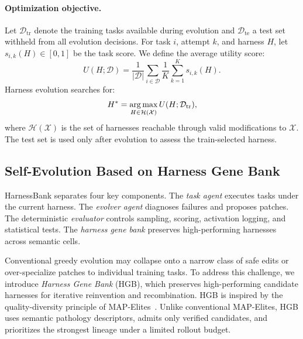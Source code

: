 \paragraph{Optimization objective.}
Let $\mathcal{D}_{\mathrm{tr}}$ denote the training tasks available during evolution and $\mathcal{D}_{\mathrm{te}}$ a test set withheld from all evolution decisions.
%
For task $i$, attempt $k$, and harness $H$, let $s_{i,k}(H)\in[0,1]$ be the task score.
%
We define the average utility score:
\begin{equation}
U(H;\mathcal{D})
=
\frac{1}{|\mathcal{D}|}
\sum_{i\in\mathcal{D}}
\frac{1}{K}
\sum_{k=1}^{K}s_{i,k}(H).
\end{equation}
%
Harness evolution searches for:
\begin{equation}
H^{*}
=
\operatorname*{arg\,max}_{H\in\mathcal{H}(\mathcal{X})}
U(H;\mathcal{D}_{\mathrm{tr}}),
\end{equation}
where $\mathcal{H}(\mathcal{X})$ is the set of harnesses reachable through valid modifications to $\mathcal{X}$.
%
The test set is used only after evolution to assess the train-selected harness.


\subsection{Self-Evolution Based on Harness Gene Bank}
\label{sec:se}
HarnessBank separates four key components.
%
The \emph{task agent} executes tasks under the current harness. The \emph{evolver agent} diagnoses failures and proposes patches. The deterministic \emph{evaluator} controls sampling, scoring, activation logging, and statistical tests. The \emph{harness gene bank} preserves high-performing harnesses across semantic cells.

Conventional greedy evolution may collapse onto a narrow class of safe edits or over-specialize patches to individual training tasks.
%
To address this challenge, we introduce \emph{Harness Gene Bank} (HGB), which preserves high-performing candidate harnesses for iterative reinvention and recombination. HGB is inspired by the quality-diversity principle of MAP-Elites~\citep{mouret2015illuminating}.
%
Unlike conventional MAP-Elites, HGB uses semantic pathology descriptors, admits only verified candidates, and prioritizes the strongest lineage under a limited rollout budget.

